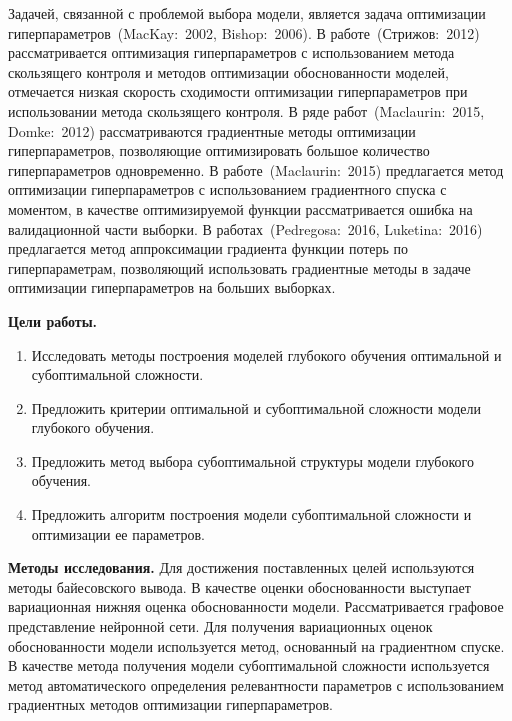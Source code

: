 \documentclass[11pt, a5paper]{dissert}
\theoremstyle{definition}
\begin{document}
Задачей, связанной с проблемой выбора модели, является задача оптимизации гиперпараметров~(MacKay:~2002, Bishop:~2006). В работе~(Стрижов:~2012) рассматривается оптимизация гиперпараметров с использованием метода скользящего контроля и методов оптимизации обоснованности моделей, отмечается низкая скорость сходимости оптимизации гиперпараметров при использовании метода скользящего контроля. В ряде работ~(Maclaurin:~2015, Domke:~2012) рассматриваются градиентные методы оптимизации гиперпараметров, позволяющие оптимизировать большое количество гиперпараметров одновременно. В работе~(Maclaurin:~2015) предлагается метод оптимизации гиперпараметров с использованием градиентного спуска с моментом, в качестве оптимизируемой функции рассматривается ошибка на валидационной части выборки. В работах~(Pedregosa:~2016, Luketina:~2016) предлагается метод аппроксимации градиента функции потерь по гиперпараметрам, позволяющий использовать градиентные методы в задаче оптимизации гиперпараметров на больших выборках. %

\vspace{0.5cm}
\textbf{Цели работы.}
\vspace{0.2cm}
\begin{enumerate}
\item Исследовать методы построения моделей глубокого обучения оптимальной и субоптимальной сложности.
\item Предложить критерии оптимальной и субоптимальной сложности модели глубокого обучения.
\item Предложить метод выбора субоптимальной структуры модели глубокого обучения.
\item Предложить алгоритм построения модели субоптимальной сложности и оптимизации ее параметров.
\end{enumerate}


\vspace{0.5cm}
\textbf{Методы исследования.} Для достижения поставленных целей используются методы байесовского вывода. В качестве оценки обоснованности выступает вариационная нижняя оценка обоснованности модели. Рассматривается графовое представление нейронной сети. Для получения вариационных оценок обоснованности модели используется метод, основанный на градиентном спуске. В качестве метода получения модели субоптимальной сложности используется метод автоматического определения релевантности параметров с использованием градиентных методов оптимизации гиперпараметров.
\end{document}
